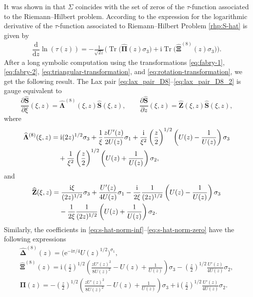 \documentclass[11pt]{article}
\numberwithin{equation}{section}
\numberwithin{equation}{section}
\newcommand{\ee}{\mathrm{e}}
\newcommand{\ii}{\mathrm{i}}
\newcommand{\Tr}{\operatorname{Tr}}
\begin{document}
It was shown in \cite{Palmer} that $\Sigma$ coincides with the set of zeros of the $\tau$-function associated to the Riemann--Hilbert problem. According to \cite{JMU} the expression for the logarithmic derivative of the $\tau$-function associated to Riemann--Hilbert Problem \ref{rhp:S-hat} is given by
\begin{gather} \label{eq:jmu-tau}
\dfrac{\mathrm{d}}{\mathrm{d}z}\ln(\tau(z))=-\frac{1}{\sqrt{2z}}\big(\Tr\big(\widehat{\mathbf{\Pi}}(z)\sigma_3\big)+\ii\Tr\big(\widehat{\mathbf{\Xi}}^{(8)}(z)\sigma_3\big)\big).
\end{gather}
 After a long symbolic computation using the transformations \eqref{eq:fabry-1}, \eqref{eq:fabry-2}, \eqref{eq:triangular-transformation}, and \eqref{eq:rotation-transformation}, we get the following result. The Lax pair \eqref{eq:lax_pair_D8}--\eqref{eq:lax_pair_D8_2} is gauge equivalent to
\[
\frac{\partial\widehat{\mathbf{S}}}{\partial\xi} (\xi, z) = {\widehat{\mathbf{\Lambda}}}^{(8)}(\xi, z) \widehat{\mathbf{S}}(\xi, z), \qquad
\frac{\partial\widehat{\mathbf{S}}}{\partial z} (\xi, z) = {\widehat{\mathbf{Z}}}(\xi, z) \widehat{\mathbf{S}}(\xi, z),
\]
where
\begin{align*}
&\widehat{\mathbf{\Lambda}}^{(8)}(\xi, z) = \ii(2z)^{1/2}\sigma_3 +\frac{1}{\xi}\frac{zU'(z)}{2U(z)}\sigma_1+\frac{\ii}{\xi^2}\left({\frac{z}{2}}\right)^{1/2}\left(U(z)-\frac{1}{U(z)}\right)\sigma_3\\
&\hphantom{\widehat{\mathbf{\Lambda}}^{(8)}(\xi, z) =}{}
+\frac{1}{\xi^2}\left({\frac{z}{2}}\right)^{1/2}\left(U(z)+\frac{1}{U(z)}\right)\sigma_2,
\end{align*}
and
\begin{align*}
&\widehat{\mathbf{Z}}(\xi, z) = \frac{\ii\xi}{(2z)^{1/2}}\sigma_3 +\frac{U'(z)}{4U(z)}\sigma_1-\frac{\ii}{2\xi}\frac{1}{(2z)^{1/2}}\left(U(z)-\frac{1}{U(z)}\right)\sigma_3\\
&\hphantom{\widehat{\mathbf{Z}}(\xi, z) =}{}
-\frac{1}{2\xi}\frac{1}{(2z)^{1/2}}\left(U(z)+\frac{1}{U(z)}\right)\sigma_2.
\end{align*}
Similarly, the coefficients in \eqref{eq:s-hat-norm-inf}--\eqref{eq:s-hat-norm-zero} have the following expressions
\begin{gather}
\widehat{\mathbf{\Delta}}^{(8)}(z)=\big(\ee^{-\ii\pi/4}U(z)^{1/2}\big)^{\sigma_1},\nonumber\\
\widehat{\mathbf{\Xi}}^{(8)}(z)=\ii\left(\frac{z}{2}\right)^{1/2}\left(\frac{zU'(z)^2}{8U(z)^2}-
 U(z)+\frac1{U(z)}\right)\sigma_3-\left(\frac{z}{2}\right)^{1/2}\frac{U'(z)}{4U(z)}\sigma_2,\nonumber\\
 \widehat{\mathbf{\Pi}}(z)=-\left(\frac{z}{2}\right)^{1/2}\left(\frac{zU'(z)^2}{8U(z)^2}-
 U(z)+\frac1{U(z)}\right)\sigma_3+\ii\left(\frac{z}{2}\right)^{1/2}\frac{U'(z)}{4U(z)}\sigma_2.\label{eq:s-hat-residues}
\end{gather}
\end{document}
